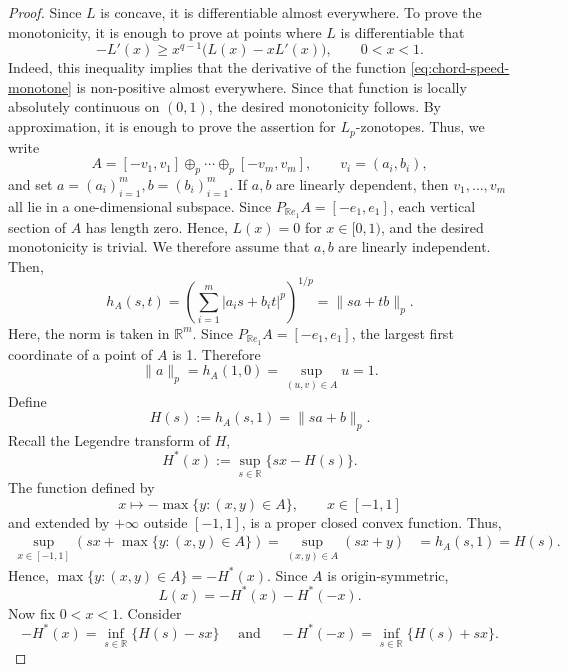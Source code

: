\documentclass[11pt,a4paper]{amsart}
\theoremstyle{plain}
\theoremstyle{definition}
\newcommand{\R}{\mathbb R}
\begin{document}
\begin{proof}
Since $L$ is concave, it is differentiable almost everywhere. To prove the monotonicity, it is enough to prove at points where $L$ is differentiable that
\begin{equation}
\label{eq:chord-speed-differential}
    -L'(x)\geq x^{q-1}\bigl(L(x)-xL'(x)\bigr),\qquad 0<x<1.
\end{equation}
Indeed, this inequality implies that the derivative of the function \eqref{eq:chord-speed-monotone} is non-positive almost everywhere. Since that function is locally absolutely continuous on $(0,1)$, the desired monotonicity follows.
By approximation, it is enough to prove the assertion for
$L_p$-zonotopes. Thus, we write
\[
A=[-v_1,v_1] \oplus_p \cdots \oplus_p [-v_m,v_m], \qquad v_i=(a_i,b_i),
\]
and set $ a=(a_i)_{i=1}^m, b=(b_i)_{i=1}^m$. If $a,b$ are linearly dependent, then $v_1,\ldots,v_m$ all lie in a one-dimensional subspace. Since $P_{\R e_1}A=[-e_1,e_1]$, each vertical section of $A$ has length zero. Hence, $L(x) = 0$ for $x \in [0,1)$, and the desired monotonicity is trivial. We therefore assume that $a,b$ are linearly independent.
Then,
\[
    h_A(s,t)= \left(\sum_{i=1}^m |a_is+b_it|^p \right)^{1/p} = 
    \|sa+tb\|_p.
\]
Here, the norm is taken in $\R^m$.
Since $P_{\R e_1}A=[-e_1,e_1]$, the largest first coordinate of a point of $A$ is 1. Therefore
\begin{equation} \label{eq:norm-of-a}
    \|a\|_p = h_A(1,0) = \sup_{(u,v) \in A} u = 1.
\end{equation}
Define
$$
    H(s):=h_A(s,1)=\|sa+b\|_p.
$$
Recall the Legendre transform of $H$,
\[
    H^*(x):=\sup _{s \in \mathbb{R}}\{s x-H(s)\}.
\]
The function defined by
\[
    x \mapsto -\max\{y:(x,y)\in A\}, \qquad x \in [-1,1]
\]
and extended by $+\infty$ outside $[-1,1]$, is a proper closed convex function.
Thus,
\begin{align}
\sup _{x \in[-1,1]}(s x+\max \{y:(x, y) \in A\})  =\sup _{(x, y) \in A}(s x+y) 
& =h_A(s, 1) 
 =H(s) .
\end{align}
Hence, 
$
    \max \{y:(x, y) \in A\}=-H^*(x).
$
Since $A$ is origin-symmetric, 
\begin{equation} \label{eq:l-formula}
    L(x) = -H^*(x) - H^*(-x).
\end{equation}
Now fix $0 < x< 1$. Consider
\begin{equation} \label{eq:Legen-H}
     -H^*(x)= \inf _{s \in \mathbb{R}}\{H(s)-s x\}\quad
\text { and }\quad - H^*(-x) =\inf _{s \in \mathbb{R}}\{H(s)+s x\} .
\end{equation}

\end{proof}
\end{document}
